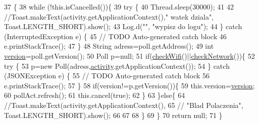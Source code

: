 \begin{DoxyCode}
37                                                 \{
38         \textcolor{keywordflow}{while} (!this.isCancelled())\{
39             \textcolor{keywordflow}{try} \{
40                 Thread.sleep(30000);
41                 
42                 \textcolor{comment}{//Toast.makeText(activity.getApplicationContext()," watek dziala",
       Toast.LENGTH\_SHORT).show();}
43                 Log.d(\textcolor{stringliteral}{""}, \textcolor{stringliteral}{"wypisz do logu"});
44             \} \textcolor{keywordflow}{catch} (InterruptedException e) \{
45                 \textcolor{comment}{// TODO Auto-generated catch block}
46                 e.printStackTrace();
47             \}
48             String adress=poll.getAddress();
49             \textcolor{keywordtype}{int} \hyperlink{classcom_1_1example_1_1qrpoll_1_1_refresh_ac9c9ddb92776f76a283dd629bf6acbf1}{version}=poll.getVersion();
50             Poll p=null;
51             \textcolor{keywordflow}{if}(\hyperlink{classcom_1_1example_1_1qrpoll_1_1_refresh_ab9c3c9d5f96d115b064440c26e4d1260}{checkWifi}()||\hyperlink{classcom_1_1example_1_1qrpoll_1_1_refresh_ade5487ac2f52c4d306d6c0308c7eae86}{checkNetwork}())\{
52             \textcolor{keywordflow}{try} \{
53                 p=\textcolor{keyword}{new} Poll(adress,\hyperlink{classcom_1_1example_1_1qrpoll_1_1_refresh_aa3e22cc50197adde6465dd4cb0ce8db5}{activity}.getApplicationContext());
54             \} \textcolor{keywordflow}{catch} (JSONException e) \{
55                 \textcolor{comment}{// TODO Auto-generated catch block}
56                 e.printStackTrace();
57             \}
58             \textcolor{keywordflow}{if}(version!=p.getVersion())\{
59                 this.version=\hyperlink{classcom_1_1example_1_1qrpoll_1_1_refresh_ac9c9ddb92776f76a283dd629bf6acbf1}{version};
60                 pollAct.refresh();
61                 this.cancel(\textcolor{keyword}{true});
62             \}
63             \}\textcolor{keywordflow}{else}\{
64                 \textcolor{comment}{//Toast.makeText(activity.getApplicationContext(),}
65                   \textcolor{comment}{//      "Blad Polaczenia", Toast.LENGTH\_SHORT).show();}
66                 
67                     
68             \}
69         \}
70         \textcolor{keywordflow}{return} null;
71     \}
\end{DoxyCode}


